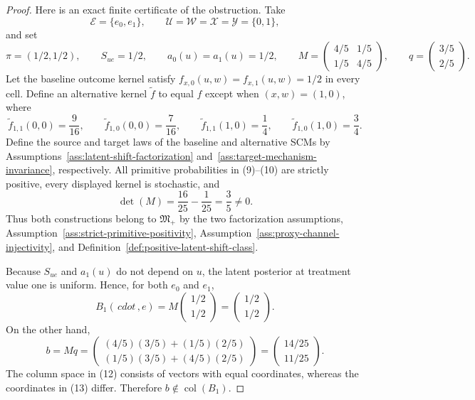 \documentclass{article}
\begin{document}
\begin{proof}
Here is an exact finite certificate of the obstruction. Take
\[
\mathcal E=\{e_0,e_1\},
\qquad
\mathcal U=\mathcal W=\mathcal X=\mathcal Y=\{0,1\},
\]
and set
\[
\pi=(1/2,1/2),
\qquad
S_{ue}=1/2,
\qquad
a_0(u)=a_1(u)=1/2,
\qquad
M=\begin{pmatrix}4/5&1/5\\[2pt]1/5&4/5\end{pmatrix},
\qquad
q=\begin{pmatrix}3/5\\[2pt]2/5\end{pmatrix}.
\tag{9}
\]
Let the baseline outcome kernel satisfy \(f_{x,0}(u,w)=f_{x,1}(u,w)=1/2\) in every cell. Define an alternative kernel \(\widetilde f\) to equal \(f\) except when \((x,w)=(1,0)\), where
\[
\widetilde f_{1,1}(0,0)=\frac9{16},
\qquad
\widetilde f_{1,0}(0,0)=\frac7{16},
\qquad
\widetilde f_{1,1}(1,0)=\frac14,
\qquad
\widetilde f_{1,0}(1,0)=\frac34.
\tag{10}
\]
Define the source and target laws of the baseline and alternative SCMs by Assumptions~\ref{ass:latent-shift-factorization} and~\ref{ass:target-mechanism-invariance}, respectively. All primitive probabilities in (9)--(10) are strictly positive, every displayed kernel is stochastic, and
\[
\det(M)=\frac{16}{25}-\frac1{25}=\frac35\ne0.
\tag{11}
\]
Thus both constructions belong to \(\mathfrak M_{+}\) by the two factorization assumptions, Assumption~\ref{ass:strict-primitive-positivity}, Assumption~\ref{ass:proxy-channel-injectivity}, and Definition~\ref{def:positive-latent-shift-class}.

Because \(S_{ue}\) and \(a_1(u)\) do not depend on \(u\), the latent posterior at treatment value one is uniform. Hence, for both \(e_0\) and \(e_1\),
\[
B_1(\,cdot\,,e)
=M\begin{pmatrix}1/2\\[2pt]1/2\end{pmatrix}
=\begin{pmatrix}1/2\\[2pt]1/2\end{pmatrix}.
\tag{12}
\]
On the other hand,
\[
b=Mq
=\begin{pmatrix}
(4/5)(3/5)+(1/5)(2/5)\\[2pt]
(1/5)(3/5)+(4/5)(2/5)
\end{pmatrix}
=\begin{pmatrix}14/25\\[2pt]11/25\end{pmatrix}.
\tag{13}
\]
The column space in (12) consists of vectors with equal coordinates, whereas the coordinates in (13) differ. Therefore \(b\notin\operatorname{col}(B_1)\).


\end{proof}
\end{document}
